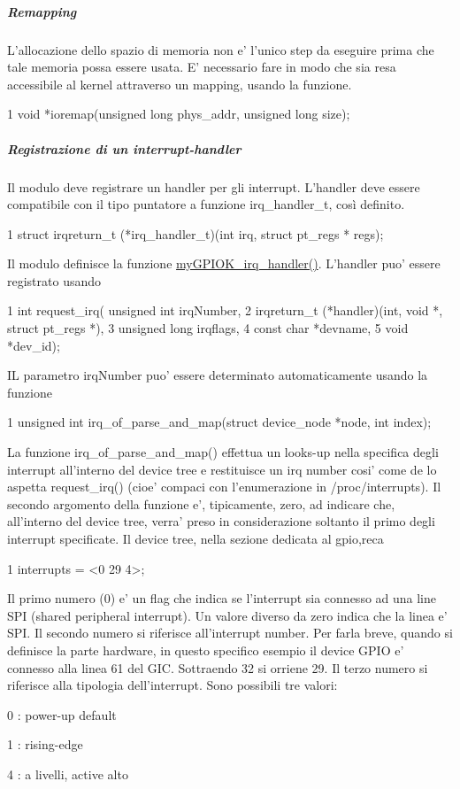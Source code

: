 \subparagraph*{Remapping}

L'allocazione dello spazio di memoria non e' l'unico step da eseguire prima che tale memoria possa essere usata. E' necessario fare in modo che sia resa accessibile al kernel attraverso un mapping, usando la funzione. 
\begin{DoxyCode}
1 void *ioremap(unsigned long phys\_addr, unsigned long size);
\end{DoxyCode}


\subparagraph*{Registrazione di un interrupt-\/handler}

Il modulo deve registrare un handler per gli interrupt. L'handler deve essere compatibile con il tipo puntatore a funzione irq\+\_\+handler\+\_\+t, così definito. 
\begin{DoxyCode}
1 struct irqreturn\_t (*irq\_handler\_t)(int irq, struct pt\_regs * regs);
\end{DoxyCode}
 Il modulo definisce la funzione \hyperlink{group___linux-_driver_ga2fc230a12a97aa63e43b2dc4aec73511}{my\+G\+P\+I\+O\+K\+\_\+irq\+\_\+handler()}. L'handler puo' essere registrato usando 
\begin{DoxyCode}
1 int request\_irq(    unsigned int irqNumber,
2                     irqreturn\_t (*handler)(int, void *, struct pt\_regs *),
3                     unsigned long irqflags,
4                     const char *devname,
5                     void *dev\_id);
\end{DoxyCode}
 I\+L parametro irq\+Number puo' essere determinato automaticamente usando la funzione 
\begin{DoxyCode}
1 unsigned int irq\_of\_parse\_and\_map(struct device\_node *node, int index);
\end{DoxyCode}
 La funzione irq\+\_\+of\+\_\+parse\+\_\+and\+\_\+map() effettua un looks-\/up nella specifica degli interrupt all'interno del device tree e restituisce un irq number cosi' come de lo aspetta request\+\_\+irq() (cioe' compaci con l'enumerazione in /proc/interrupts). Il secondo argomento della funzione e', tipicamente, zero, ad indicare che, all'interno del device tree, verra' preso in considerazione soltanto il primo degli interrupt specificate. Il device tree, nella sezione dedicata al gpio,reca 
\begin{DoxyCode}
1 interrupts = <0 29 4>;
\end{DoxyCode}
 Il primo numero (0) e' un flag che indica se l'interrupt sia connesso ad una line S\+P\+I (shared peripheral interrupt). Un valore diverso da zero indica che la linea e' S\+P\+I. Il secondo numero si riferisce all'interrupt number. Per farla breve, quando si definisce la parte hardware, in questo specifico esempio il device G\+P\+I\+O e' connesso alla linea 61 del G\+I\+C. Sottraendo 32 si orriene 29. Il terzo numero si riferisce alla tipologia dell'interrupt. Sono possibili tre valori\+:
\begin{DoxyItemize}
\item 0 \+: power-\/up default
\item 1 \+: rising-\/edge
\item 4 \+: a livelli, active alto
\end{DoxyItemize}

